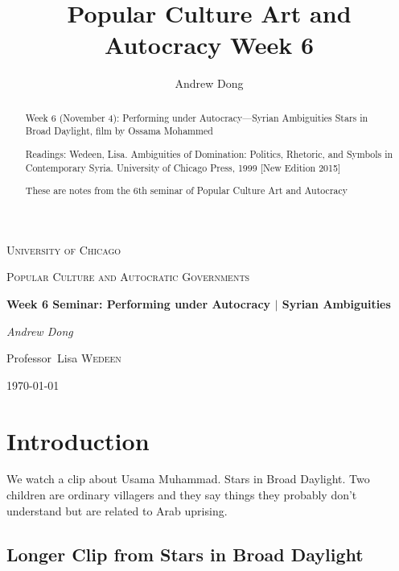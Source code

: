 \documentclass{article}
\begin{document}
\begin{titlepage}
	\centering
	{\scshape\LARGE University of Chicago \par}
	\vspace{1cm}
	{\scshape\Large Popular Culture and Autocratic Governments\par}
	\vspace{1.5cm}
	{\huge\bfseries Week 6 Seminar: Performing under Autocracy $|$ Syrian Ambiguities \par}
	\vspace{1cm}
	{\Large\itshape Andrew Dong\par}
	\vspace{2cm}
	
	\vfill
\begin{abstract}
Week 6 (November 4): Performing under Autocracy—Syrian Ambiguities
 Stars in Broad Daylight, film by Ossama Mohammed

Readings:
Wedeen, Lisa. Ambiguities of Domination: Politics, Rhetoric, and Symbols in Contemporary Syria. University of Chicago Press, 1999 [New Edition 2015] 
 

\end{abstract}

\vfill

	Professor~Lisa \textsc{Wedeen}
	\vspace{5 mm}
	\\{\large \today\par}
\end{titlepage}

\title{Popular Culture Art and Autocracy Week 6}
\author{Andrew Dong}

\maketitle

\begin{abstract}
These are notes from the 6th seminar of Popular Culture Art and Autocracy\end{abstract}

\section{Introduction}
We watch a clip about Usama Muhammad.  Stars in Broad Daylight.  Two children are ordinary villagers and they say things they probably don't understand but are related to Arab uprising.  


\subsection{Longer Clip from Stars in Broad Daylight}
\end{document}
